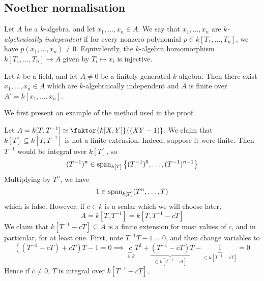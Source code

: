 \subsection{Noether normalisation}
\begin{definition}
    Let \( A \) be a \( k \)-algebra, and let \( x_1, \dots, x_n \in A \).
    We say that \( x_1, \dots, x_n \) are \emph{\( k \)-algebraically independent} if for every nonzero polynomial \( p \in k[T_1, \dots, T_n] \), we have \( p(x_1, \dots, x_n) \neq 0 \).
    Equivalently, the \( k \)-algebra homomorphism \( k[T_1, \dots, T_n] \to A \) given by \( T_i \mapsto x_i \) is injective.
\end{definition}
\begin{theorem}
    Let \( k \) be a field, and let \( A \neq 0 \) be a finitely generated \( k \)-algebra.
    Then there exist \( x_1, \dots, x_n \in A \) which are \( k \)-algebraically independent and \( A \) is finite over \( A' = k[x_1, \dots, x_n] \).
\end{theorem}
We first present an example of the method used in the proof.
\begin{example}
    Let \( A = k[T, T^{-1}] \simeq \faktor{k[X,Y]}{(XY - 1)} \).
    We claim that \( k[T] \subseteq k[T, T^{-1}] \) is not a finite extension.
    Indeed, suppose it were finite.
    Then \( T^{-1} \) would be integral over \( k[T] \), so
    \[ (T^{-1})^n \in \operatorname{span}_{k[T]}\qty{(T^{-1})^0, \dots, (T^{-1})^{n-1}} \]
    Multiplying by \( T^n \), we have
    \[ 1 \in \operatorname{span}_{k[T]}(T^n, \dots, T) \]
    which is false.
    However, if \( c \in k \) is a scalar which we will choose later,
    \[ A = k[T, T^{-1}] = k[T, T^{-1} - cT] \]
    We claim that \( k[T^{-1} - cT] \subseteq A \) is a finite extension for most values of \( c \), and in particular, for at least one.
    First, note \( T^{-1} T - 1 = 0 \), and then change variables to
    \[ ((T^{-1} - cT) + cT) T - 1 = 0 \implies \underbrace{c}_{\in k} T^2 + \underbrace{(T^{-1} - cT)}_{\in k[T^{-1} - ct]} T - \underbrace{1}_{\in k[T^{-1} - cT]} = 0 \]
    Hence if \( c \neq 0 \), \( T \) is integral over \( k[T^{-1} - cT] \).
\end{example}
